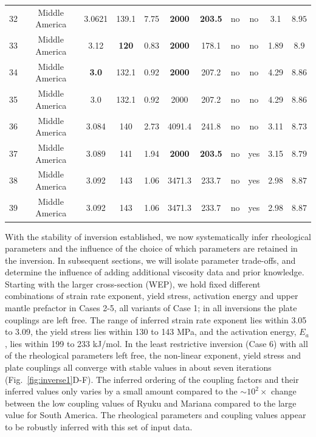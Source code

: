 \documentclass[12pt]{article}
\begin{document}
{\begin{table}
\begin{table}[H]
{\begin{tabular}{c c c c c c c c c c c }
            32 &Middle America  & 3.0621 & 139.1 & 7.75& \textbf{2000} & \textbf{203.5} &no  &no &3.1 & $8.95$ \\               
            33 &Middle America  & 3.12 & \textbf{120} & 0.83& \textbf{2000} & 178.1 &no &no &1.89 & $8.9$ \\       
            34 &Middle America  & \textbf{3.0} & 132.1 & 0.92& \textbf{2000}& 207.2 &no &no &4.29 & $8.86$   \\      
            35 &Middle America  & 3.0 & 132.1 & 0.92& 2000& 207.2 &no &no &4.29 & $8.86$ \\     
            36 &Middle America  & 3.084 & 140 & 2.73& 4091.4 & 241.8 &no  &no &3.11 & $8.73$ \\                  
            37 &Middle America  & 3.089 & 141 & 1.94& \textbf{2000} & \textbf{203.5} &no  &yes & 3.15 & $8.79$\\              
           38 &Middle America  & 3.092 & 143 & 1.06& 3471.3 & 233.7 &no  &yes &2.98 &$8.87$ \\       
           39 &Middle America  & 3.092 & 143 & 1.06& 3471.3 & 233.7 &no  &yes &2.98 &$8.87$ \\             
                \hline %
		\end{tabular}
        }
		\label{table:inversions} %
		\end{table}
\end{table}


With the stability of inversion established, we now systematically infer rheological parameters and the influence of the choice of which parameters are retained in the inversion. In subsequent sections, we will isolate parameter trade-offs, and determine the influence of adding additional viscosity data and prior knowledge. 
Starting with the larger cross-section (WEP), we hold fixed different combinations of strain rate exponent, yield stress, activation energy and upper mantle prefactor in Cases 2-5, all variants of Case 1; in all inversions the plate couplings are left free. The range of inferred strain rate exponent lies within  3.05 to 3.09, the yield stress lies within 130 to 143 MPa, and the activation energy, $E_a$, lies within 199 to 233 kJ/mol. In the least restrictive inversion (Case 6) with all of the rheological parameters left free, the non-linear exponent, yield stress and plate couplings all converge with stable values in about seven iterations (Fig.~\ref{fig:inverse1}D-F).
The inferred ordering of the coupling factors and their inferred values only varies by a small amount compared to the $\sim10^2\times$ change between the low coupling values of Ryuku and Mariana compared to the large value for South America.
The rheological parameters and coupling values appear to be robustly inferred with this set of input data.


}
\end{document}
